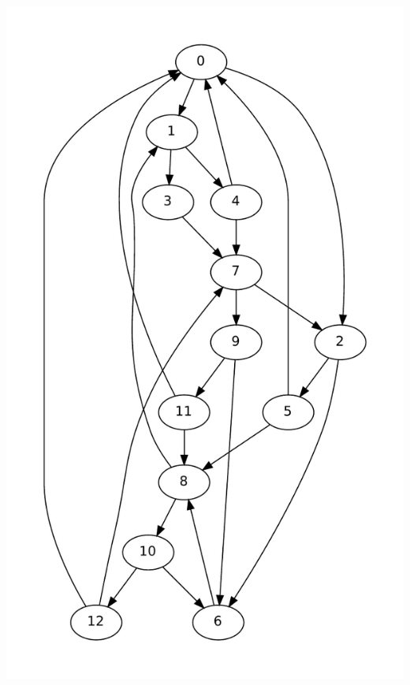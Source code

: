 \documentclass{beamer}
\begin{document}
\begin{frame}
\begin{minipage}{0.3\linewidth}
  \includegraphics[scale=0.3]{rg}
\end{minipage}

\end{frame}
\end{document}
